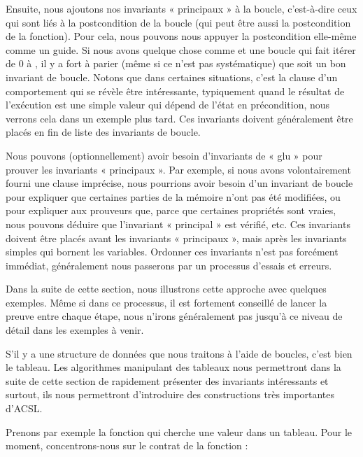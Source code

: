 Ensuite, nous ajoutons nos invariants « principaux » à la boucle, c'est-à-dire
ceux qui sont liés à la postcondition de la boucle (qui peut être aussi la
postcondition de la fonction). Pour cela, nous pouvons nous appuyer la
postcondition elle-même comme un guide. Si nous avons quelque chose comme
 et une boucle qui fait itérer  de 0 à
, il y a fort à parier (même si ce n'est pas systématique) que  soit
un bon invariant de boucle. Notons que dans certaines situations, c'est la
clause  d'un comportement qui se révèle être intéressante,
typiquement quand le résultat de l'exécution est une simple valeur qui dépend
de l'état en précondition, nous verrons cela dans un exemple plus tard. Ces
invariants doivent généralement être placés en fin de liste des invariants
de boucle.


Nous pouvons (optionnellement) avoir besoin d'invariants de « glu » pour prouver
les invariants « principaux ». Par exemple, si nous avons volontairement fourni
une clause  imprécise, nous pourrions avoir besoin
d'un invariant de boucle pour expliquer que certaines parties de la mémoire
n'ont pas été modifiées, ou pour expliquer aux
prouveurs que, parce que certaines propriétés sont vraies, nous pouvons déduire
que l'invariant « principal » est vérifié, etc. Ces invariants doivent être
placés avant les invariants « principaux », mais après les invariants simples
qui bornent les variables. Ordonner ces invariants n'est pas forcément immédiat,
généralement nous passerons par un processus d'essais et erreurs.


Dans la suite de cette section, nous illustrons cette approche avec quelques
exemples. Même si dans ce processus, il est fortement conseillé de lancer la
preuve entre chaque étape, nous n'irons généralement pas jusqu'à ce niveau de
détail dans les exemples à venir.


\label{l3:statements-loops-examples-ro}


S'il y a une structure de données que nous traitons à l'aide de boucles, c'est
bien le tableau. Les algorithmes manipulant des tableaux nous permettront dans
la suite de cette section de rapidement présenter des invariants intéressants
et surtout, ils nous permettront d'introduire des constructions très importantes
d'ACSL.


Prenons par exemple la fonction qui cherche une valeur dans un tableau. Pour le
moment, concentrons-nous sur le contrat de la fonction :


